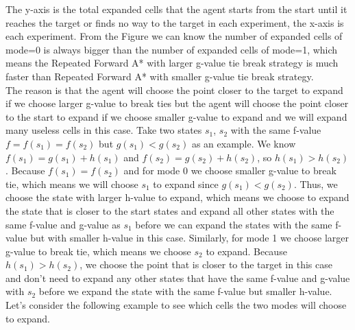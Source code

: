 \documentclass[11pt]{article}
\begin{document}
The y-axis is the total expanded cells that the agent starts from the start until it reaches the target or finds no way to the target in each experiment, the x-axis is each experiment.
From the Figure we can know the number of expanded cells of mode=0 is always bigger than the number of expanded cells of mode=1, which means the  Repeated Forward A* with larger g-value tie break strategy
is much faster than Repeated Forward A* with smaller g-value tie break
strategy.\\
The reason is that  the agent will choose the point  closer to the target to  expand  if we choose larger g-value to break ties but the agent will choose the point closer to the start to expand if we choose smaller g-value to expand and we will expand many useless cells in this case. Take two states $s_1$, $s_2$ with the same f-value $f=f(s_1)=f(s_2)$ but $g(s_1)<g(s_2)$ as an example. We know $f(s_1)=g(s_1)+h(s_1)$ and $f(s_2)=g(s_2)+h(s_2)$, so $h(s_1)>h(s_2)$. Because $f(s_1)=f(s_2)$ and for mode 0 we choose smaller g-value to break tie, which means we will choose $s_1$ to expand since $g(s_1)<g(s_2)$. Thus, we choose the state with larger h-value to expand, which means we choose to expand the state that is closer to the start states and expand all other states with the same f-value and g-value as $s_1$ before  we can expand the states with the same f-value but with smaller h-value in this case. Similarly, for mode 1 we choose larger g-value to break tie, which means we choose $s_2$ to expand. Because $h(s_1)>h(s_2)$, we choose the point that is closer to the target in this case and don't need to expand any other states that have the same f-value and g-value with $s_2$ before we expand the state with the same f-value but smaller h-value.  Let's consider the following example to see which cells the two modes will choose to expand.
\end{document}
